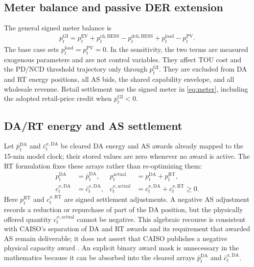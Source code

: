 \documentclass[final,5p,times]{elsarticle}
\newcommand{\EV}{\mathrm{EV}}
\newcommand{\BESS}{\mathrm{BESS}}
\newcommand{\DA}{\mathrm{DA}}
\newcommand{\RT}{\mathrm{RT}}
\newcommand{\GI}{\mathrm{GI}}
\newcommand{\PV}{\mathrm{PV}}
\newcommand{\ch}{\mathrm{ch}}
\newcommand{\dch}{\mathrm{dch}}
\newcommand{\actual}{\mathrm{actual}}
\newcommand{\load}{\mathrm{load}}
\begin{document}
\subsection{Meter balance and passive DER extension}
\label{sec:passive_der}
The general signed meter balance is
\begin{align}
p_t^{\GI}
=p_t^{\EV}+p_t^{\ch,\BESS}-p_t^{\dch,\BESS}
+p_t^{\load}-p_t^{\PV}. \label{eq:meter}
\end{align}
The base case sets $p_t^{\load}=p_t^{\PV}=0$. In the sensitivity, the two terms are measured exogenous parameters and are not control variables. They affect TOU cost and the PD/NCD threshold trajectory only through $p_t^{\GI}$. They are excluded from DA and RT energy positions, all AS bids, the shared capability envelope, and all wholesale revenue. Retail settlement use the signed meter in \eqref{eq:meter}, including the adopted retail-price credit when $p_t^{\GI}<0$.

\subsection{DA/RT energy and AS settlement}
Let $\bar p_t^{\DA}$ and $\bar c_t^{x,\DA}$ be cleared DA energy and AS awards
already mapped to the 15-min model clock; their stored values are zero whenever
no award is active. The RT formulation fixes these arrays rather than
re-optimizing them:
\begin{align}
p_t^{\DA}&=\bar p_t^{\DA},&
p_t^{\actual}&=p_t^{\DA}+p_t^{\RT}, \label{eq:actual_energy}\\
c_t^{x,\DA}&=\bar c_t^{x,\DA},&
c_t^{x,\actual}&=c_t^{x,\DA}+c_t^{x,\RT}\ge0. \label{eq:actual_as}
\end{align}
Here $p_t^{\RT}$ and $c_t^{x,\RT}$ are signed settlement adjustments. A
negative AS adjustment records a reduction or repurchase of part of the DA
position, but the physically offered quantity $c_t^{x,\actual}$ cannot be
negative. This algebraic recourse is consistent with CAISO's separation of DA
and RT awards and its requirement that awarded AS remain deliverable; it does
not assert that CAISO publishes a negative physical capacity award
\cite{caisoMarketOperations2026,caisoNGRCommitment2020}. An explicit binary
award mask is unnecessary in the mathematics because it can be absorbed into
the cleared arrays $\bar p_t^{\DA}$ and $\bar c_t^{x,\DA}$.
\end{document}
